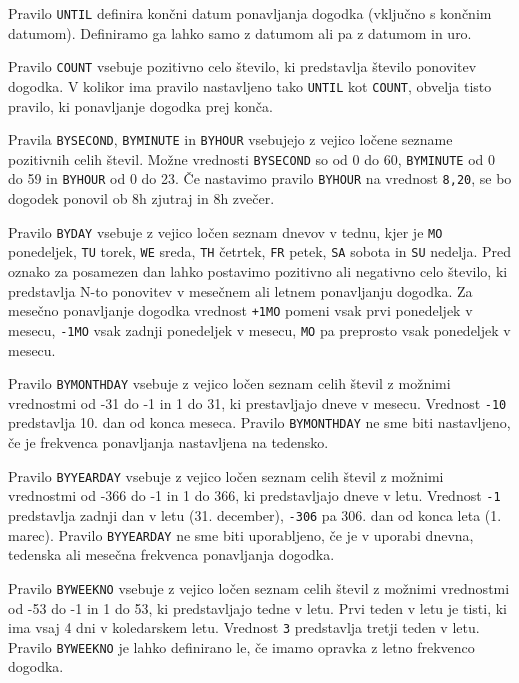 Pravilo \texttt{UNTIL} definira končni datum ponavljanja dogodka (vključno s končnim datumom). Definiramo ga lahko samo z datumom ali pa z datumom in uro.

Pravilo \texttt{COUNT} vsebuje pozitivno celo število, ki predstavlja število ponovitev dogodka. V kolikor ima pravilo nastavljeno tako \texttt{UNTIL} kot \texttt{COUNT}, obvelja tisto pravilo, ki ponavljanje dogodka prej konča.

Pravila \texttt{BYSECOND}, \texttt{BYMINUTE} in \texttt{BYHOUR} vsebujejo z vejico ločene sezname pozitivnih celih števil. Možne vrednosti \texttt{BYSECOND} so od 0 do 60, \texttt{BYMINUTE} od 0 do 59 in \texttt{BYHOUR} od 0 do 23. Če nastavimo pravilo \texttt{BYHOUR} na vrednost \texttt{8,20}, se bo dogodek ponovil ob 8h zjutraj in 8h zvečer.

Pravilo \texttt{BYDAY} vsebuje z vejico ločen seznam dnevov v tednu, kjer je \texttt{MO} ponedeljek, \texttt{TU} torek, \texttt{WE} sreda, \texttt{TH} četrtek, \texttt{FR} petek, \texttt{SA} sobota in \texttt{SU} nedelja. Pred oznako za posamezen dan lahko postavimo pozitivno ali negativno celo število, ki predstavlja N-to ponovitev v mesečnem ali letnem ponavljanju dogodka. Za mesečno ponavljanje dogodka vrednost \texttt{+1MO} pomeni vsak prvi ponedeljek v mesecu, \texttt{-1MO} vsak zadnji ponedeljek v mesecu, \texttt{MO} pa preprosto vsak ponedeljek v mesecu.

Pravilo \texttt{BYMONTHDAY} vsebuje z vejico ločen seznam celih števil z možnimi vrednostmi od -31 do -1 in 1 do 31, ki prestavljajo dneve v mesecu. Vrednost \texttt{-10} predstavlja 10. dan od konca meseca. Pravilo \texttt{BYMONTHDAY} ne sme biti nastavljeno, če je frekvenca ponavljanja nastavljena na tedensko.

Pravilo \texttt{BYYEARDAY} vsebuje z vejico ločen seznam celih števil z možnimi vrednostmi od -366 do -1 in 1 do 366, ki predstavljajo dneve v letu. Vrednost \texttt{-1} predstavlja zadnji dan v letu (31. december), \texttt{-306} pa 306. dan od konca leta (1. marec). Pravilo \texttt{BYYEARDAY} ne sme biti uporabljeno, če je v uporabi dnevna, tedenska ali mesečna frekvenca ponavljanja dogodka.

Pravilo \texttt{BYWEEKNO} vsebuje z vejico ločen seznam celih števil z možnimi vrednostmi od -53 do -1 in 1 do 53, ki predstavljajo tedne v letu. Prvi teden v letu je tisti, ki ima vsaj 4 dni v koledarskem letu. Vrednost \texttt{3} predstavlja tretji teden v letu. Pravilo \texttt{BYWEEKNO} je lahko definirano le, če imamo opravka z letno frekvenco dogodka.

